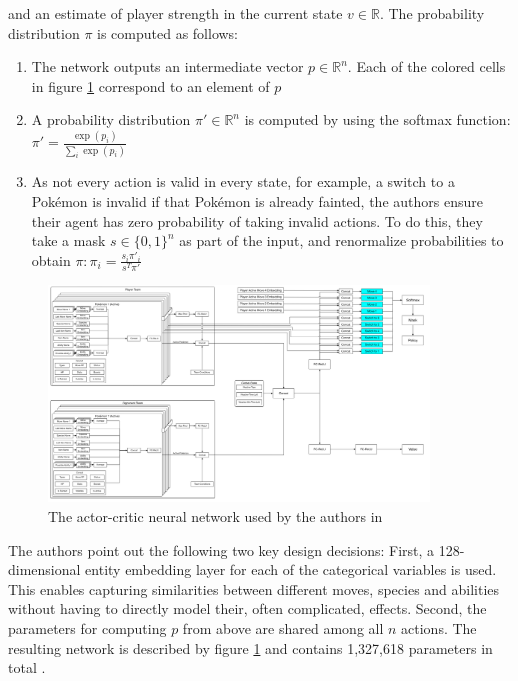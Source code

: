 and an estimate of player strength in the current state $v \in \mathbb{R}$. The probability distribution
$\pi$ is computed as follows:
\begin{enumerate}
    \item The network outputs an intermediate vector $p \in \mathbb{R}^n$. Each of the colored cells in
    figure \ref{fig:lee-network} correspond to an element of $p$
    \item A probability distribution $\pi' \in \mathbb{R}^n$ is computed by using the
    softmax function: $\pi' = \frac{\exp(p_i)}{\sum_i \exp(p_i)}$
    \item As not every action is valid in every state, for example, a switch to a Pokémon is invalid
    if that Pokémon is already fainted, the authors ensure their agent has zero probability of taking
    invalid actions. To do this, they take a mask $s \in \{0, 1\}^n$ as part of the input, and 
    renormalize probabilities to obtain $\pi: \pi_i = \frac{s_i \pi'_i}{s^T \pi'}$
\end{enumerate}
\begin{figure}
	\centering
	\includegraphics[width=0.9\textwidth]{images/RL-Network-Structure.png}
	\caption{The actor-critic neural network used by the authors in \cite{Lee_Togelius_2017}}
	\label{fig:lee-network}
\end{figure}
The authors point out the following two key design decisions: First, a 128-dimensional entity embedding layer
for each of the categorical variables is used. This enables capturing similarities between different moves,
species and abilities without having to directly model their, often complicated, effects. Second, the
parameters for computing $p$ from above are shared among all $n$ actions. The resulting network is described
by figure \ref{fig:lee-network} and contains 1,327,618 parameters in total \cite{Lee_Togelius_2017}.

